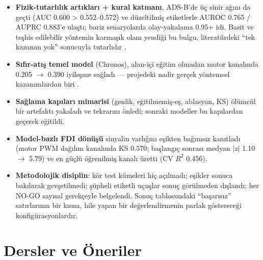 \documentclass[11pt,a4paper]{article}
\begin{document}
\begin{itemize}[itemsep=2pt]
  \item \textbf{Fizik-tutarlılık artıkları + kural katmanı}, ADS-B'de üç sinir
        ağını da geçti (AUC 0.600 > 0.552--0.572) ve düzeltilmiş etiketlerle
        AUROC 0.765 / AUPRC 0.883'e ulaştı; bariz senaryolarda olay-yakalama
        0.95+ idi. Basit ve teşhis edilebilir yöntemin karmaşık olanı yendiği
        bu bulgu, literatürdeki ``tek kazanan yok'' sonucuyla tutarlıdır
        \cite{schmidl2022eval}.
  \item \textbf{Sıfır-atış temel model} (Chronos), alan-içi eğitim olmadan
        motor kanalında 0.205 $\to$ 0.390 iyileşme sağladı --- projedeki nadir
        gerçek yöntemsel kazanımlardan biri \cite{ansari2024chronos}.
  \item \textbf{Sağlama kapıları mimarisi} (genlik, eğitilmemiş-eş, ablasyon,
        KS) ölümcül bir artefaktı yakaladı ve tekrarını önledi; sonraki
        modeller bu kapılardan geçerek eğitildi.
  \item \textbf{Model-bazlı FDI dönüşü} sinyalin varlığını eşikten bağımsız
        kanıtladı (motor PWM dağılım kanalında KS 0.570; başlangıç sonrası
        medyan $|z|$ 1.10 $\to$ 5.79) ve en güçlü öğrenilmiş kanalı üretti
        (CV $R^2$ 0.456).
  \item \textbf{Metodolojik disiplin}: kör test kümeleri hiç açılmadı; eşikler
        sonuca bakılarak gevşetilmedi; şüpheli etiketli uçuşlar sonuç
        görülmeden dışlandı; her NO-GO sayısal gerekçeyle belgelendi.
        Sonuç tablosundaki ``başarısız'' satırlarının bir kısmı, hile yapan bir
        değerlendirmenin parlak göstereceği konfigürasyonlardır.
\end{itemize}

\section{Dersler ve Öneriler}
\end{document}
